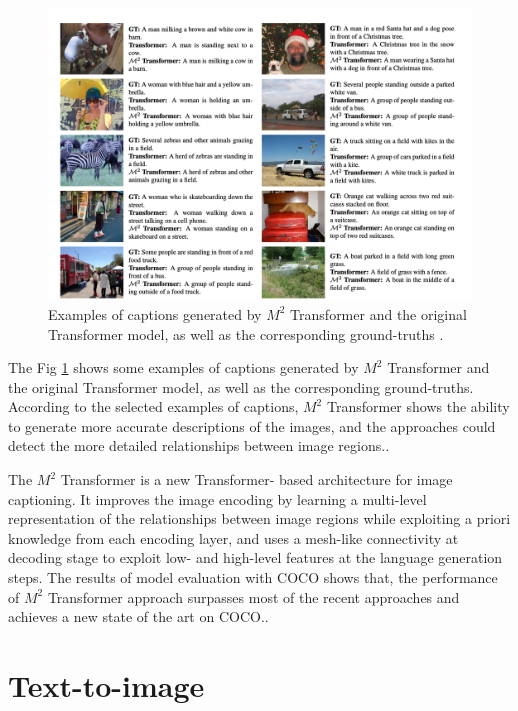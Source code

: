 \documentclass[
]{krantz}
\begin{document}
\begin{figure}

{\centering \includegraphics[width=1\linewidth]{figures/02-01/02-02 example2} 

}

\caption{Examples of captions generated by \(M^2\) Transformer and the original Transformer model, as well as the corresponding ground-truths \citep{cornia2020m2}.}\label{fig:example2}
\end{figure}



The Fig \ref{fig:example2} shows some examples of captions generated by \(M^2\) Transformer and the original Transformer model, as well as the corresponding ground-truths. According to the selected examples of captions, \(M^2\) Transformer shows the ability to generate more accurate descriptions of the images, and the approaches could detect the more detailed relationships between image regions.\citep{cornia2020m2}.

The \(M^2\) Transformer is a new Transformer- based architecture for image captioning. It improves the image encoding by learning a multi-level representation of the relationships between image regions while exploiting a priori knowledge from each encoding layer, and uses a mesh-like connectivity at decoding stage to exploit low- and high-level features at the language generation steps. The results of model evaluation with COCO shows that, the performance of \(M^2\) Transformer approach surpasses most of the recent approaches and achieves a new state of the art on COCO.\citep{cornia2020m2}.

\hypertarget{c02-02-text2img}{%
\section{Text-to-image}\label{c02-02-text2img}}
\end{document}
